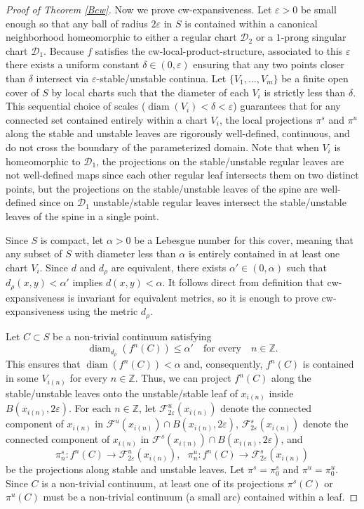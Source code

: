 \documentclass{amsart}
\theoremstyle{plain}
\theoremstyle{definition}
\newcommand{\mc}{\mathcal}
\newcommand{\Z}{\mathbb{Z}}
\newcommand{\eps}{\varepsilon}
\newcommand{\diam}{\operatorname{diam}}
\begin{document}
\begin{proof}[Proof of Theorem \ref{Bcw}]
Now we prove cw-expansiveness.  Let $\eps>0$ be small enough so that any ball of radius $2\eps$ in $S$ is contained within a canonical neighborhood homeomorphic to either a regular chart $\mc{D}_2$ or a $1$-prong singular chart $\mc{D}_1$. Because $f$ satisfies the cw-local-product-structure, associated to this $\eps$ there exists a uniform constant $\delta\in(0,\eps)$ ensuring that any two points closer than $\delta$ intersect via $\eps$-stable/unstable continua. Let $\{V_1, \dots, V_m\}$ be a finite open cover of $S$ by local charts such that the diameter of each $V_i$ is strictly less than $\delta$. This sequential choice of scales ($\operatorname{diam}(V_i) < \delta < \eps$) guarantees that for any connected set contained entirely within a chart $V_i$, the local projections $\pi^s$ and $\pi^u$ along the stable and unstable leaves are rigorously well-defined, continuous, and do not cross the boundary of the parameterized domain.  Note that when $V_i$ is homeomorphic to $\mc{D}_1$, the projections on the stable/unstable regular leaves are not well-defined maps since each other regular leaf intersects them on two distinct points, but the projections on the stable/unstable leaves of the spine are well-defined since on $\mc{D}_1$ unstable/stable regular leaves intersect the stable/unstable leaves of the spine in a single point.

Since $S$ is compact, let $\alpha > 0$ be a Lebesgue number for this cover, meaning that any subset of $S$ with diameter less than $\alpha$ is entirely contained in at least one chart $V_i$. Since $d$ and $d_{\rho}$ are equivalent, there exists $\alpha'\in(0,\alpha)$ such that $d_{\rho}(x,y)<\alpha'$ implies $d(x,y)<\alpha$.
It follows direct from definition that cw-expansiveness is invariant for equivalent metrics, so it is enough to prove cw-expansiveness using the metric $d_{\rho}$. 

Let $C\subset S$ be a non-trivial continuum satisfying \begin{equation}\label{diamcw}\operatorname{diam}_{d_\rho}(f^n(C)) \leq \alpha' \,\,\,\,\,\, \text{for every} \,\,\,\,\,\, n \in \mathbb{Z}.
\end{equation}
This ensures that $\diam(f^n(C))<\alpha$ and, consequently, $f^n(C)$ is contained in some  $V_{i(n)}$ for every $n\in\Z$. Thus, we can project $f^n(C)$ along the stable/unstable leaves onto the unstable/stable leaf of $x_{i(n)}$ inside $B(x_{i(n)},2\eps)$. For each $n\in\Z$, let $\mc{F}^u_{2\eps}(x_{i(n)})$ denote the connected component of $x_{i(n)}$ in $\mc{F}^u(x_{i(n)})\cap B(x_{i(n)},2\eps)$, $\mc{F}^s_{2\eps}(x_{i(n)})$ denote the connected component of $x_{i(n)}$ in $\mc{F}^s(x_{i(n)})\cap B(x_{i(n)},2\eps)$, and
$$\pi^s_n\colon f^n(C)\to\mc{F}^u_{2\eps}(x_{i(n)}), \,\,\,\, \pi^u_n\colon f^n(C)\to\mc{F}^s_{2\eps}(x_{i(n)})$$ be the projections along stable and unstable leaves.
Let $\pi^s=\pi^s_0$ and $\pi^u=\pi^u_0$.
Since $C$ is a  non-trivial continuum, at least one of its projections $\pi^s(C)$ or $\pi^u(C)$ must be a non-trivial continuum (a small arc) contained within a leaf. 


\end{proof}
\end{document}
